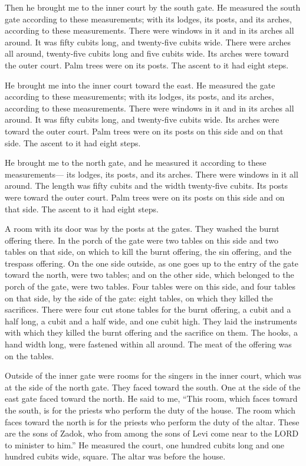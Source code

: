 \myverse{}Then he brought me to the inner court by the south gate. He
measured the south gate according to these measurements;
\myverse{}with its lodges, its posts, and its arches, according to these measurements.
There were windows in it and in its arches all around. It was fifty cubits long, and twenty-five cubits
wide.
\myverse{}There were arches all around, twenty-five cubits long and five cubits wide.
\myverse{}Its arches were toward the outer court. Palm trees were on its posts. The
ascent to it had eight steps.

\myverse{}He brought me into the inner court toward the east. He measured
the gate according to these measurements;
\myverse{}with its lodges, its posts, and its arches, according to these measurements.
There were windows in it and in its arches all around. It was fifty cubits long, and twenty-five cubits
wide.
\myverse{}Its arches were toward the outer court. Palm trees were on its posts on this
side and on that side. The ascent to it had eight steps.

\myverse{}He brought me to the north gate, and he measured it according
to these measurements—
\myverse{}its lodges, its posts, and its arches. There were windows in it all around.
The length was fifty cubits and the width twenty-five cubits.
\myverse{}Its posts were toward the outer court. Palm trees were on its posts on this
side and on that side. The ascent to it had eight steps.

\myverse{}A room with its door was by the posts at the gates. They washed
the burnt offering there.
\myverse{}In the porch of the gate were two tables on this side and two tables on that
side, on which to kill the burnt offering, the sin offering, and the trespass offering.
\myverse{}On the one side outside, as one goes up to the entry of the gate toward the
north, were two tables; and on the other side, which belonged to the porch of the gate, were two tables.
\myverse{}Four tables were on this side, and four tables on that side, by the side
of the gate: eight tables, on which they killed the sacrifices.
\myverse{}There were four cut stone tables for the burnt offering, a cubit and a half
long, a cubit and a half wide, and one cubit high. They laid the instruments with which they killed the
burnt offering and the sacrifice on them.
\myverse{}The hooks, a hand width long, were fastened within all around. The meat of
the offering was on the tables.

\myverse{}Outside of the inner gate were rooms for the singers in the
inner court, which was at the side of the north gate. They faced toward the south. One at the side of
the east gate faced toward the north.
\myverse{}He said to me, “This room, which faces toward the south, is for the priests
who perform the duty of the house.
\myverse{}The room which faces toward the north is for the priests who perform the
duty of the altar. These are the sons of Zadok, who from among the sons of Levi come near to the LORD
to minister to him.”
\myverse{}He measured the court, one hundred cubits long and one hundred cubits wide,
square. The altar was before the house.

